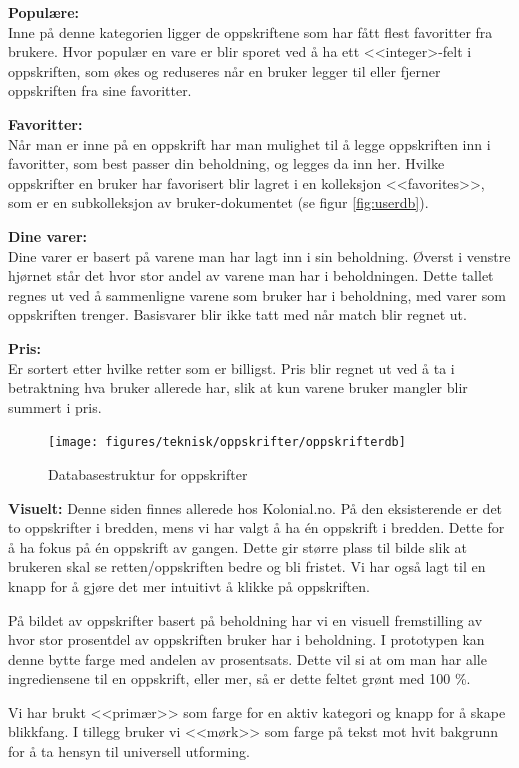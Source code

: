 \textbf{Populære:}
\\Inne på denne kategorien ligger de oppskriftene som har fått flest favoritter fra brukere. Hvor populær en vare er blir sporet ved å ha ett <<integer>-felt i oppskriften, som økes og reduseres når en bruker legger til eller fjerner oppskriften fra sine favoritter.

\textbf{Favoritter:}
\\Når man er inne på en oppskrift har man mulighet til å legge oppskriften inn i favoritter, som best passer din beholdning, og legges da inn her. Hvilke oppskrifter en bruker har favorisert blir lagret i en kolleksjon <<favorites>>, som er en subkolleksjon av bruker-dokumentet (se figur \ref{fig:userdb}).

\textbf{Dine varer:}
\\Dine varer er basert på varene man har lagt inn i sin beholdning. Øverst i venstre hjørnet står det hvor stor andel av varene man har i beholdningen. Dette tallet regnes ut ved å sammenligne varene som bruker har i beholdning, med varer som oppskriften trenger. Basisvarer blir ikke tatt med når match blir regnet ut.

\textbf{Pris:}
\\Er sortert etter hvilke retter som er billigst. Pris blir regnet ut ved å ta i betraktning hva bruker allerede har, slik at kun varene bruker mangler blir summert i pris.

\begin{figure}[!h]
    \texttt{[image: figures/teknisk/oppskrifter/oppskrifterdb]}
    \caption[Oppskrifter - Databasestruktur]{Databasestruktur for oppskrifter
    \label{fig:oppskrifterdb}}
\end{figure}

\newpage
\textbf{Visuelt:}
Denne siden finnes allerede hos Kolonial.no. På den eksisterende er det to oppskrifter i bredden, mens vi har valgt å ha én oppskrift i bredden. Dette for å ha fokus på én oppskrift av gangen. Dette gir større plass til bilde slik at brukeren skal se retten/oppskriften bedre og bli fristet. Vi har også lagt til en knapp for å gjøre det mer intuitivt å klikke på oppskriften.

På bildet av oppskrifter basert på beholdning har vi en visuell fremstilling av hvor stor prosentdel av oppskriften bruker har i beholdning. I prototypen kan denne bytte farge med andelen av prosentsats. Dette vil si at om man har alle ingrediensene til en oppskrift, eller mer, så er dette feltet grønt med 100 \%.

Vi har brukt <<primær>> som farge for en aktiv kategori og knapp for å
skape blikkfang. I tillegg bruker vi <<mørk>> som farge på tekst mot hvit bakgrunn
for å ta hensyn til universell utforming.


